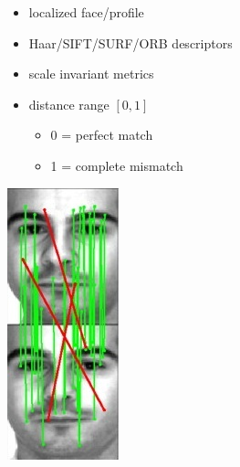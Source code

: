 
\begin{xpsectionbox}{}{}

\begin{minipage}{0.37\linewidth}
{\vspace*{0.2cm}\noindent\hspace*{0.2cm}{\bf\Titlesize Method}\newline}{\vspace{-0.75cm}}
\begin{itemize}
	\item localized face/profile
	\item Haar/SIFT/SURF/ORB descriptors
	\item scale invariant metrics
	\item distance range $[0,1]$
	\begin{itemize}
		\item 0 = perfect match
		\item 1 = complete mismatch
	\end{itemize}
\end{itemize}
\end{minipage}
\begin{minipage}{0.25\linewidth}
\begin{center}
	\includegraphics[width=0.45\linewidth]{images/face_match_sift}
	

\end{center}
\end{minipage}
\end{xpsectionbox}
